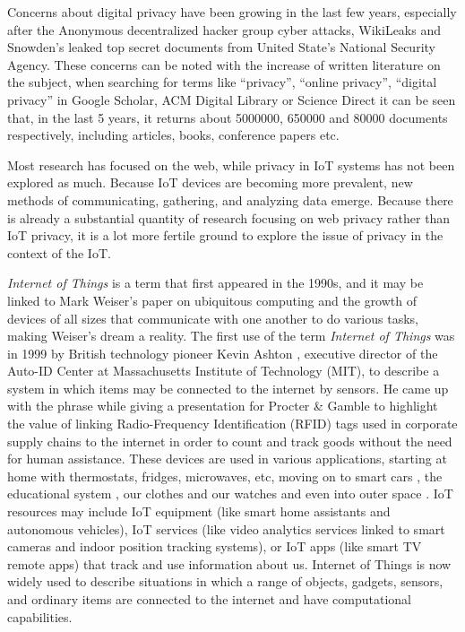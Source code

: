 Concerns about digital privacy have been growing \cite{emami2019exploring, park2022personal, zhang2022peer}
in the last few years, especially after the Anonymous decentralized hacker
group cyber attacks, WikiLeaks and Snowden's leaked top secret documents
from United State's National Security Agency. These concerns can be noted
with the increase of written literature on the subject, when searching for
terms like ``privacy'', ``online privacy'', ``digital privacy'' in Google
Scholar, ACM Digital Library or Science Direct it can be seen that, in the
last 5 years, it returns about 5000000, 650000 and 80000 documents respectively,
including articles, books, conference papers etc.

Most research has focused on the web, while privacy in IoT systems has not
been explored as much. Because IoT devices are becoming more prevalent,
new methods of communicating, gathering, and analyzing data emerge.
Because there is already a substantial quantity of research focusing on
web privacy rather than IoT privacy, it is a lot more fertile ground to
explore the issue of privacy in the context of the IoT.

\textit{Internet of Things} is a term that first appeared in the 1990s,
and it may be linked to Mark Weiser's paper on ubiquitous computing \cite{weiser1991computer}
and the growth of devices of all sizes that communicate with one another
to do various tasks, making Weiser's dream a reality. The first use of the
term \textit{Internet of Things} was in 1999 by British technology pioneer
Kevin Ashton \cite{KevinThat}, executive director of the Auto-ID Center
at Massachusetts Institute of Technology (MIT), to describe a system in
which items may be connected to the internet by sensors. He came up with
the phrase while giving a presentation for Procter \& Gamble to highlight
the value of linking Radio-Frequency Identification (RFID) tags used in
corporate supply chains to the internet in order to count and track goods
without the need for human assistance. These devices are used in various
applications, starting at home \cite{marikyan2019systematic} with thermostats,
fridges, microwaves, etc, moving on to smart cars \cite{arena2020overview},
the educational system \cite{al2020survey}, our clothes and our watches \cite{niknejad2020comprehensive}
and even into outer space \cite{AkyildizInternet}. IoT resources may include
IoT equipment (like smart home assistants and autonomous vehicles), IoT
services (like video analytics services linked to smart cameras and indoor
position tracking systems), or IoT apps (like smart TV remote apps) that
track and use information about us. Internet of Things is now widely used
to describe situations in which a range of objects, gadgets, sensors, and
ordinary items are connected to the internet and have computational capabilities.

